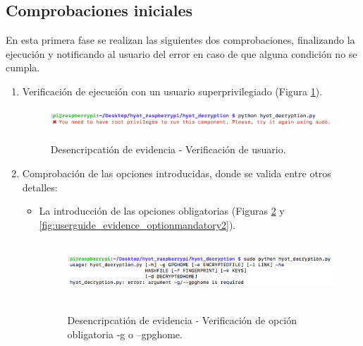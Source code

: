 \documentclass[12pt,a4paper, twoside]{report}
\begin{document}
	 \subsection{Comprobaciones iniciales}
	 
	 En esta primera fase se realizan las siguientes dos comprobaciones, finalizando la ejecución y notificando al usuario del error en caso de que alguna condición no se cumpla. 
	 
	 \begin{enumerate}
	 	\item Verificación de ejecución con un usuario superprivilegiado (Figura \ref{fig:userguide_evidence_root}).
		
		\begin{figure}[!ht]   
			\caption{Desencripcatión de evidencia - Verificación de usuario.} 
			\begin{center} 
				\includegraphics[width=14cm,height=0.8cm]{Images/userGuide/evidence/root} \\
				\label{fig:userguide_evidence_root} 
			\end{center}  
		\end{figure}
	 	
	 	\item Comprobación de las opciones introducidas, donde se valida entre otros detalles:
	 	
	 	\begin{itemize}
	 		\item La introducción de las opciones obligatorias (Figuras \ref{fig:userguide_evidence_optionmandatory1} y \ref{fig:userguide_evidence_optionmandatory2}).
	 		
	 		\begin{figure}[!ht]   
				\caption{Desencripcatión de evidencia - Verificación de opción obligatoria -g o --gpghome.} 
				\begin{center} 
					\includegraphics[width=16cm,height=2.2cm]{Images/userGuide/evidence/option_mandatory1} \\
					\label{fig:userguide_evidence_optionmandatory1} 
				\end{center}  
			\end{figure}
			

\end{itemize}
\end{enumerate}
\end{document}
